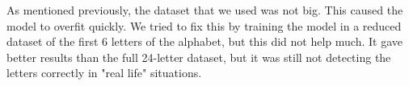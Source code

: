 \documentclass[../paper.tex]{subfiles}
\begin{document}
As mentioned previously, the dataset that we used was not big. This caused the model to overfit quickly.
We tried to fix this by training the model in a reduced dataset of the first 6 letters of the alphabet, 
but this did not help much. 
It gave better results than the full 24-letter dataset, but it was still 
not detecting the letters correctly in "real life" situations.
\end{document}
